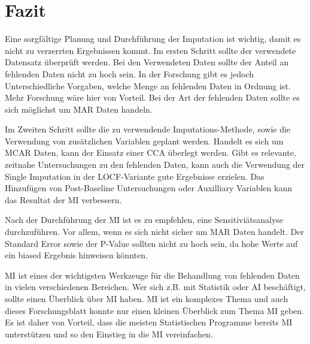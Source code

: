 \section{Fazit}

Eine sorgfältige Planung und Durchführung der Imputation ist wichtig, damit es nicht zu verzerrten Ergebnissen kommt. 
Im ersten Schritt sollte der verwendete Datensatz überprüft werden. Bei den Verwendeten Daten sollte der Anteil an fehlenden 
Daten nicht zu hoch sein. In der Forschung gibt es jedoch Unterschiedliche Vorgaben, welche Menge an fehlenden Daten in 
Ordnung ist. Mehr Forschung wäre hier von Vorteil. Bei der Art der fehlenden Daten sollte es sich möglichst um MAR Daten 
handeln. 

Im Zweiten Schritt sollte die zu verwendende Imputations-Methode, sowie die Verwendung von zusätzlichen Variablen geplant 
werden. 
Handelt es sich um MCAR Daten, kann der Einsatz einer CCA überlegt werden. Gibt es relevante, zeitnahe Untersuchungen 
zu den fehlenden Daten, kann auch die Verwendung der Single Imputation in der LOCF-Variante gute Ergebnisse erzielen. 
Das Hinzufügen von Post-Baseline Untersuchungen oder Auxilliary Variablen kann das Resultat der MI verbessern. 

Nach der Durchführung der MI ist es zu empfehlen, eine Sensitiviätsanalyse durchzuführen. Vor allem, wenn es sich nicht 
sicher um MAR Daten handelt. Der Standard Error sowie der P-Value sollten nicht zu hoch sein, da hohe Werte auf ein 
biased Ergebnis hinweisen könnten.

MI ist eines der wichtigsten Werkzeuge für die Behandlung von fehlenden Daten in vielen verschiedenen Bereichen. 
Wer sich z.B. mit Statistik oder AI beschäftigt, sollte einen Überblick über MI haben. MI ist ein komplexes Thema und 
auch dieses Forschungsblatt konnte nur einen kleinen Überblick zum Thema MI geben. Es ist daher von Vorteil, dass die 
meisten Statistischen Programme bereits MI unterstützen und so den Einstieg in die MI vereinfachen. 


